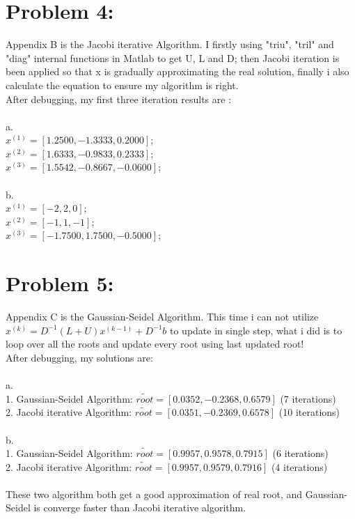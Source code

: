 \documentclass{article}
\begin{document}
\newpage
\section{Problem 4:} 
Appendix B is the Jacobi iterative Algorithm. I firstly using "triu", "tril" and "diag" internal functions in Matlab to get U, L and D; then Jacobi iteration is been applied so that x is gradually approximating the real solution, finally i also calculate the equation to ensure my algorithm is right. \\ 
After debugging, my first three iteration results are : \\
\\
a. \\
$x^{(1)} = [1.2500, -1.3333, 0.2000]$; \\
$x^{(2)} = [1.6333, -0.9833, 0.2333]$; \\
$x^{(3)} = [1.5542, -0.8667, -0.0600]$; \\
\\
b. \\
$x^{(1)} = [-2, 2, 0]$; \\
$x^{(2)} = [-1, 1, -1]$; \\
$x^{(3)} = [-1.7500, 1.7500, -0.5000]$; \\

\section{Problem 5:}
Appendix C is the Gaussian-Seidel Algorithm. This time i can not utilize $x^{(k)} = D^{-1}(L+U)x^{(k-1)}+D^{-1}b$ to update in single step, what i did is to loop over all the roots and update every root using last updated root! \\
After debugging, my solutions are: \\
\\
a. \\
1. Gaussian-Seidel Algorithm: $\widetilde{root}=[0.0352, -0.2368, 0.6579]$ (7 iterations) \\
2. Jacobi iterative Algorithm: $\widetilde{root}=[0.0351, -0.2369, 0.6578]$ (10 iterations) \\
\\
b. \\
1. Gaussian-Seidel Algorithm: $\widetilde{root}=[0.9957, 0.9578, 0.7915]$ (6 iterations) \\
2. Jacobi iterative Algorithm: $\widetilde{root}=[0.9957, 0.9579, 0.7916]$ (4 iterations) \\
\\
These two algorithm both get a good approximation of real root, and Gaussian-Seidel is converge faster than Jacobi iterative algorithm.
\end{document}
